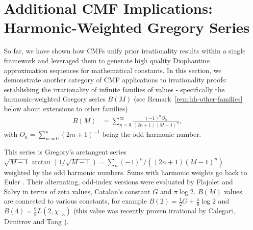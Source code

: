 \documentclass[oneside,english,11pt]{amsart}
\begin{document}
\section{Additional CMF Implications: Harmonic-Weighted Gregory Series}
\label{sec:other_implications}

So far, we have shown how CMFs unify prior irrationality results within a single framework and leveraged them to generate high quality Diophantine approximation sequences for mathematical constants.
In this section, we demonstrate another category of CMF applications to irrationality proofs: establishing the irrationality of infinite families of values 
- specifically the harmonic-weighted Gregory series $B(M)$
(see Remark~\ref{rem:hh-other-families} below about extensions to other families) 
\begin{equation}\label{eq:eq:hh-series}
\begin{aligned}
 B(M)&=\sum_{n=0}^{\infty}\frac{(-1)^nO_n}{(2n+1)(M-1)^n},
\end{aligned}
\end{equation}
with $O_n=\sum_{m=0}^n(2m+1)^{-1}$ being the odd harmonic number.

This series is Gregory's arctangent series \cite{turnbull1939gregory} $\sqrt{M-1}\arctan(1/\sqrt{M-1})=\sum_n(-1)^n/((2n+1)(M-1)^n)$ weighted by the odd harmonic numbers.
Sums with harmonic weights go back to Euler \cite{euler1776meditationes}. Their alternating, odd-index versions were evaluated by 
Flajolet and Salvy \cite{flajolet1998euler} in terms of zeta values, Catalan's constant $G$ and $\pi\log2$.
$B(M)$ values are connected to various constants, for example $B(2)=\frac12G+\frac\pi8\log2$ and $B(4)=\frac98L(2,\chi_{-3})$
(this value was recently proven irrational by Calegari, Dimitrov and Tang \cite{calegari2024linear}).

\end{document}
